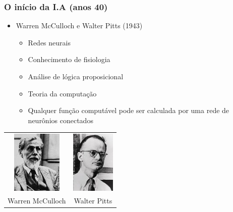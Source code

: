 \documentclass[aspectratio=169]{beamer}
\begin{document}
	\begin{frame}
		\frametitle{O início da I.A (anos 40)}
		\begin{itemize}
			\item Warren McCulloch e Walter Pitts (1943)
			\begin{itemize}
				\item Redes neurais
				\item Conhecimento de fisiologia
				\item Análise de lógica proposicional
				\item Teoria da computação
				\item Qualquer função computável pode ser calculada por uma rede de neurônios conectados
			\end{itemize}
		\end{itemize}
		
		\begin{table}
			\centering
			\begin{tabular}{c c}				
				\includegraphics[height=3cm, keepaspectratio]{../figs/cap01/wsmcculloch.jpg} & 				
				\includegraphics[height=3cm, keepaspectratio]{../figs/cap01/pitts.jpg} \\	
				Warren McCulloch & Walter Pitts
				
			\end{tabular}
		\end{table}
	\end{frame}	
\end{document}
